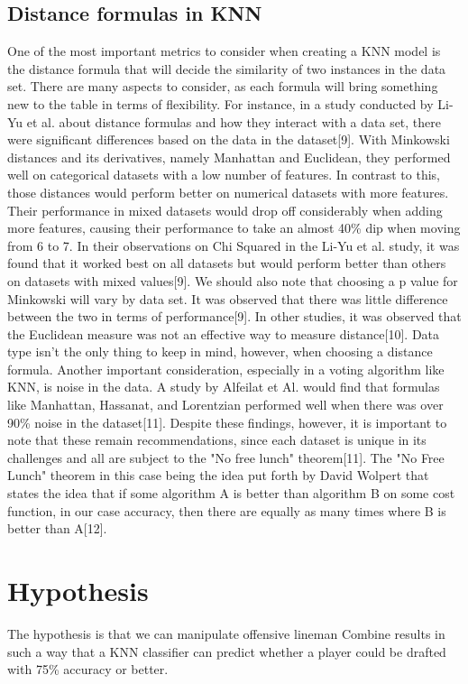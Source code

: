 \documentclass[confrence]{IEEEtran}
\begin{document}
\subsection*{Distance formulas in KNN}
One of the most important metrics to consider when creating a KNN model is the distance formula that will decide the similarity of two instances in the data set.
There are many aspects to consider, as each formula will bring something new to the table in terms of flexibility. For instance, in a study conducted by Li-Yu et al. about distance formulas and how they interact with a data set, there were significant differences based on the data in the dataset[9].
With Minkowski distances and its derivatives, namely Manhattan and Euclidean, they performed well on categorical datasets with a low number of features.
In contrast to this, those distances would perform better on numerical datasets with more features.
Their performance in mixed datasets would drop off considerably when adding more features, causing their performance to take an almost 40\% dip when moving from 6 to 7.
In their observations on Chi Squared in the Li-Yu et al. study, it was found that it worked best on all datasets but would perform better than others on datasets with mixed values[9].
We should also note that choosing a p value for Minkowski will vary by data set. It was observed that there was little difference between the two in terms of performance[9].
In other studies, it was observed that the Euclidean measure was not an effective way to measure distance[10]. Data type isn't the only thing to keep in mind, however, when choosing a distance formula.
Another important consideration, especially in a voting algorithm like KNN, is noise in the data. A study by Alfeilat et Al. would find that formulas like Manhattan, Hassanat, and Lorentzian performed well when there was over 90\% noise in the dataset[11].
Despite these findings, however, it is important to note that these remain recommendations, since each dataset is unique in its challenges and all are subject to the "No free lunch" theorem[11].
The "No Free Lunch" theorem in this case being the idea put forth by David Wolpert that states the idea that if some algorithm A is better than algorithm B on some cost function, in our case accuracy, then there are equally as many times where B is better than A[12].
\section*{Hypothesis}
The hypothesis is that we can manipulate offensive lineman Combine results in such a way that a KNN classifier can predict whether a player could be drafted with 75\% accuracy or better.
\end{document}
